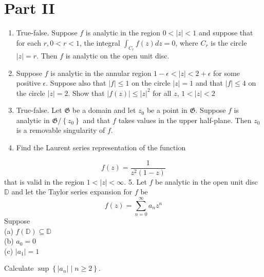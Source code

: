 \documentclass[10pt]{article}
\begin{document}
\section{Part II}
\begin{enumerate}
  \item True-false. Suppose $f$ is analytic in the region $0<|z|<1$ and suppose that for each $r, 0<r<1$, the integral $\int_{C_{r}} f(z) d z=0$, where $C_{r}$ is the circle $|z|=r$. Then $f$ is analytic on the open unit disc.

  \item Suppose $f$ is analytic in the annular region $1-\epsilon<|z|<2+\epsilon$ for some positive $\epsilon$. Suppose also that $|f| \leq 1$ on the circle $|z|=1$ and that $|f| \leq 4$ on the circle $|z|=2$. Show that $|f(z)| \leq|z|^{2}$ for all $z$, $1<|z|<2$

  \item True-false. Let $\mathfrak{G}$ be a domain and let $z_{0}$ be a point in $\mathfrak{G}$. Suppose $f$ is analytic in $\mathfrak{G} /\left\{z_{0}\right\}$ and that $f$ takes values in the upper half-plane. Then $z_{0}$ is a removable singularity of $f$.

  \item Find the Laurent series representation of the function

\end{enumerate}
$$
f(z)=\frac{1}{z^{2}(1-z)}
$$
that is valid in the region $1<|z|<\infty$. 5. Let $f$ be analytic in the open unit disc $\mathbb{D}$ and let the Taylor series expansion for $f$ be
$$
f(z)=\sum_{n=0}^{\infty} a_{n} z^{n}
$$
Suppose\\
(a) $f(\mathbb{D}) \subseteq \mathbb{D}$\\
(b) $a_{0}=0$\\
(c) $\left|a_{1}\right|=1$

Calculate $\sup \left\{\left|a_{n}\right| \mid n \geq 2\right\}$.
\end{document}
